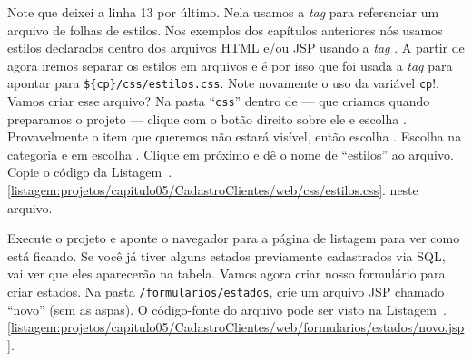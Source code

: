 Note que deixei a linha 13 por último. Nela usamos a \textit{tag}  para referenciar um arquivo de folhas de estilos. Nos exemplos dos capítulos anteriores nós usamos estilos declarados dentro dos arquivos HTML e/ou JSP usando a \textit{tag} . A partir de agora iremos separar os estilos em arquivos e é por isso que foi usada a \textit{tag}  para apontar para \texttt{\$\{cp\}/css/estilos.css}. Note novamente o uso da variável \texttt{cp}!. Vamos criar esse arquivo? Na pasta ``\texttt{css}'' dentro de  --- que criamos quando preparamos o projeto --- clique com o botão direito sobre ele e escolha . Provavelmente o item que queremos não estará visível, então escolha . Escolha  na categoria e em  escolha . Clique em próximo e dê o nome de ``estilos'' ao arquivo. Copie o código da Listagem~\thechapter.\ref{listagem:projetos/capitulo05/CadastroClientes/web/css/estilos.css}. neste arquivo.


Execute o projeto e aponte o navegador para a página de listagem para ver como está ficando. Se você já tiver alguns estados previamente cadastrados via SQL, vai ver que eles aparecerão na tabela. Vamos agora criar nosso formulário para criar estados. Na pasta \texttt{/formularios/estados}, crie um arquivo JSP chamado ``novo'' (sem as aspas). O código-fonte do arquivo pode ser visto na Listagem~\thechapter.\ref{listagem:projetos/capitulo05/CadastroClientes/web/formularios/estados/novo.jsp}.


